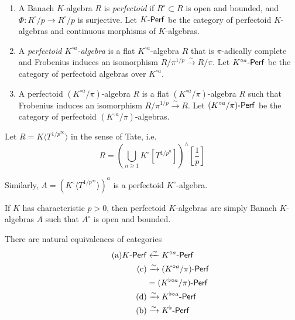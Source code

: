 \documentclass{article}
\begin{document}
\begin{definition}
\begin{enumerate}
  \item A Banach $K$-algebra $R$ is \emph{perfectoid} if $R^\circ\subset R$ is 
    open and bounded, and $\Phi:R^\circ/p \to R^\circ/p$ is surjective. Let 
    $K\textnormal{-}\mathsf{Perf}$ be the category of perfectoid $K$-algebras and continuous 
    morphisms of $K$-algebras. 
  \item A \emph{perfectoid $K^{\circ a}$-algebra} is a flat 
    $K^{\circ a}$-algebra $R$ that is $\pi$-adically complete and Frobenius 
    induces an isomorphism $R/\pi^{1/p} \xrightarrow\sim R/\pi$. Let 
    $K^{\circ a}\textnormal{-}\mathsf{Perf}$ be the category of perfectoid algebras over 
    $K^{\circ a}$. 
  \item A perfectoid $(K^{\circ a}/\pi)$-algebra $R$ is a flat 
    $(K^{\circ a}/\pi)$-algebra $R$ such that Frobenius induces an isomorphism 
    $R/\pi^{1/p} \xrightarrow \sim R$. Let $(K^{\circ a}/\pi)\textnormal{-}\mathsf{Perf}$ be the 
    category of perfectoid $(K^{\circ a}/\pi)$-algebras. 
\end{enumerate}
\end{definition}

\begin{example}
Let $R=K\langle T^{1/p^\infty}\rangle$ in the sense of Tate, i.e. 
\[
  R=\left(\bigcup_{n\geqslant 1} K^\circ[T^{1/p^n}]\right)^\wedge[\frac 1 p] 
\]
\end{example}

\begin{example}
Similarly, $A=(K^\circ\langle T^{1/p^\infty}\rangle)^a$ is a perfectoid 
$K^\circ$-algebra. 
\end{example}

\begin{example}
If $K$ has characteristic $p>0$, then perfectoid $K$-algebras are simply 
Banach $K$-algebras $A$ such that $A^\circ$ is open and bounded. 
\end{example}

\begin{theorem}
There are natural equivalences of categories 
\begin{align*} \tag{a}\label{eq:a}
  K\textnormal{-}\mathsf{Perf} &\xleftarrow\sim K^{\circ a}\textnormal{-}\mathsf{Perf} \\ \tag{c}\label{eq:c}
    &\xrightarrow\sim (K^{\circ a}/\pi)\textnormal{-}\mathsf{Perf} \\ 
    &= (K^{\flat\circ a}/\pi)\textnormal{-}\mathsf{Perf} \\ \tag{d}\label{eq:d}
    &\xrightarrow\sim K^{\flat\circ a}\textnormal{-}\mathsf{Perf} \\ \tag{b}\label{eq:b}
    & \xrightarrow\sim K^\flat\textnormal{-}\mathsf{Perf}
\end{align*}
\end{theorem}
\end{document}
